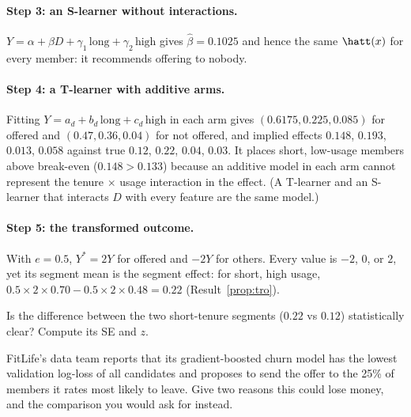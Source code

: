 \documentclass[11pt]{article}
\begin{document}
\paragraph{Step 3: an S-learner without interactions.} $Y = \alpha + \beta D + \gamma_1\,\text{long} + \gamma_2\,\text{high}$
gives $\hat\beta = 0.1025$ and hence the same $\hatt(x)$ for every member: it recommends offering to nobody.

\paragraph{Step 4: a T-learner with additive arms.} Fitting $Y = a_d + b_d\,\text{long} + c_d\,\text{high}$ in each arm
gives $(0.6175, 0.225, 0.085)$ for offered and $(0.47, 0.36, 0.04)$ for not offered, and implied effects
$0.148$, $0.193$, $0.013$, $0.058$ against true $0.12$, $0.22$, $0.04$, $0.03$. It places short, low-usage members above
break-even ($0.148 > 0.133$) because an additive model in each arm cannot represent the tenure $\times$ usage
interaction in the effect. (A T-learner and an S-learner that interacts $D$ with every feature are the same
model.)

\paragraph{Step 5: the transformed outcome.} With $e = 0.5$, $Y^\ast = 2Y$ for offered and $-2Y$ for others. Every
value is $-2$, $0$, or $2$, yet its segment mean is the segment effect: for short, high usage,
$0.5 \times 2 \times 0.70 - 0.5 \times 2 \times 0.48 = 0.22$ (Result~\ref{prop:tro}).

\begin{exercise}[computation]
Is the difference between the two short-tenure segments ($0.22$ vs $0.12$) statistically clear? Compute its SE
and $z$.
\end{exercise}

\begin{exercise}[judgment]
FitLife's data team reports that its gradient-boosted churn model has the lowest validation log-loss of all
candidates and proposes to send the offer to the 25\% of members it rates most likely to leave. Give two
reasons this could lose money, and the comparison you would ask for instead.
\end{exercise}
\end{document}
